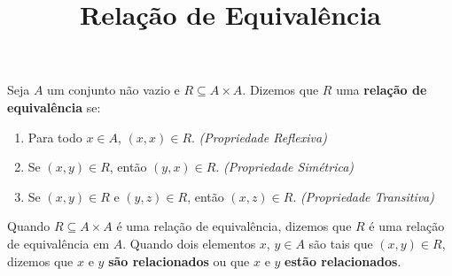 \documentclass{beamer}
\title{Rela\c{c}\~ao de Equival\^encia}
\author[\autor]{\autor}
\institute[\instituto]{\instituto}
\date{}
\begin{document}
    \begin{frame}
        \maketitle
    \end{frame}


    \begin{frame}
        \begin{definicao}
            Seja $A$ um conjunto n{\~a}o vazio \pause e $R\subseteq A \times A$. \pause Dizemos que $R$  uma \textbf{rela{\c c}{\~a}o de equival{\^e}ncia} se:\pause
            \begin{enumerate}[label={\roman*})]
                \item Para todo $x \in A$, \pause $(x,x) \in R$. \pause \textit{(Propriedade Reflexiva)}\pause
                \item Se $(x, y) \in R$, \pause ent\~ao $(y, x) \in R$. \pause \textit{(Propriedade Sim\'etrica)}\pause
                \item Se $(x, y) \in R$ \pause e $(y, z) \in R$, \pause ent\~ao $(x, z)\in R$. \pause \textit{(Propriedade Transitiva)}\pause
            \end{enumerate}
        \end{definicao}

        Quando $R\subseteq A \times A$ {\'e} uma rela{\c c}{\~a}o de equival{\^e}ncia, \pause dizemos que $R$ {\'e} uma rela{\c c}{\~a}o de equival{\^e}ncia em $A$. \pause Quando dois elementos $x$, $y \in A$ \pause s{\~a}o tais que $(x,y) \in R$, \pause dizemos que $x$ e $y$ \textbf{s{\~a}o relacionados} \pause ou que $x$ e $y$ \textbf{est\~ao relacionados}.\pause
    \end{frame}
\end{document}
